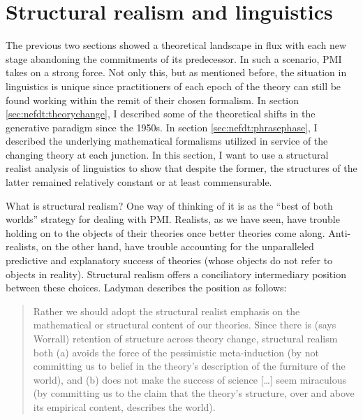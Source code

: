 \documentclass[output=paper]{langscibook}
\begin{document}
\section{Structural realism and linguistics}
\label{sec:nefdt:structuralrealism}

The previous two sections showed a theoretical landscape in flux with each new stage abandoning the commitments of its predecessor. In such a scenario, PMI takes on a strong force. Not only this, but as mentioned before, the situation in linguistics is unique since practitioners of each epoch of the theory can still be found working within the remit of their chosen formalism. In section \ref{sec:nefdt:theorychange}, I described some of the theoretical shifts in the generative paradigm since the 1950s. In section \ref{sec:nefdt:phrasephase}, I described the underlying mathematical formalisms utilized in service of the changing theory at each junction. In this section, I want to use a structural realist analysis of linguistics to show that despite the former, the structures of the latter remained relatively constant or at least commensurable. 

What is structural realism? One way of thinking of it is as the ``best of both worlds'' strategy for dealing with PMI. Realists, as we have seen, have trouble holding on to the objects of their theories once better theories come along. Anti-realists, on the other hand, have trouble accounting for the unparalleled predictive and explanatory success of theories (whose objects do not refer to objects in reality). Structural realism offers a conciliatory intermediary position between these choices. Ladyman describes the position as follows:

\begin{quote}
Rather we should adopt the structural realist emphasis on the mathematical or structural content of our theories. Since there is (says Worrall) retention of structure across theory change, structural realism both (a) avoids the force of the pessimistic meta-induction (by not committing us to belief in the theory's description of the furniture of the world), and (b) does not make the success of science […] seem miraculous (by committing us to the claim that the theory's structure, over and above its empirical content, describes the world). \citep[410]{Ladyman1998}
\end{quote}
\end{document}
